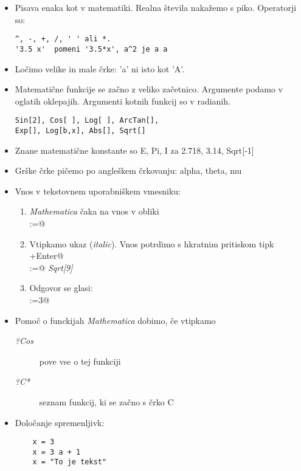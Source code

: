 \begin{itemize}
  \item Pisava enaka kot v matematiki. Realna števila nakažemo s piko.
Operatorji so:
\begin{verbatim}
^, -, +, /, ' ' ali *.
'3.5 x'  pomeni '3.5*x', a^2 je a a
\end{verbatim}

  \item Ločimo velike in male črke: 'a' ni isto kot 'A'.

  \item Matematične funkcije se začno z veliko začetnico. Argumente podamo v
oglatih oklepajih. Argumenti kotnih funkcij so v radianih.
\begin{verbatim}
Sin[2], Cos[ ], Log[ ], ArcTan[],
Exp[], Log[b,x], Abs[], Sqrt[]
\end{verbatim}

\item Znane matematične konstante so E, Pi, I za 2.718, 3.14, Sqrt[-1]

\item Grške črke pičemo po angleškem črkovanju: alpha, theta, mu

\item Vnos v tekstovnem uporabniškem vmesniku:
\begin{enumerate}
  \item \emph{Mathematica} čaka na vnos v obliki \\
   \verb@In[1]:=@
  \item Vtipkamo ukaz (\emph{italic}). Vnos potrdimo s hkratnim pritiskom tipk \newline \verb@Shift+Enter@ \\
 \verb@In[1]:=@ \emph{Sqrt[9]}
  \item Odgovor se glasi: \\
 \verb@Out[1]:=3@
\end{enumerate}

\item Pomoč o funckijah \emph{Mathematica} dobimo, če vtipkamo 
\begin{description}
  \item[\emph{?Cos}] pove vse o tej funkciji
  \item[\emph{?C*}] seznam funkcij, ki se začno s črko C
\end{description}

\item Določanje spremenljivk:
\begin{verbatim}
    x = 3
    x = 3 a + 1
    x = "To je tekst"
\end{verbatim}


\end{itemize}
